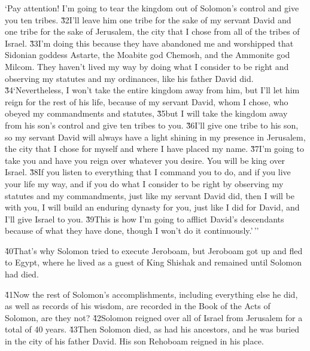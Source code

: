 \begin{poetry}
\poeml `Pay attention! I'm going to tear the kingdom out of Solomon's control and give you ten tribes. \v{32}I'll leave him one tribe for the sake of my servant David and one tribe for the sake of Jerusalem, the city that I chose from all of the tribes of Israel. \v{33}I'm doing this because they have abandoned me and worshipped that Sidonian goddess Astarte, the Moabite god Chemosh, and the Ammonite god Milcom. They haven't lived my way by doing what I consider to be right and observing my statutes and my ordinances, like his father David did. \\
\poeml \v{34}`Nevertheless, I won't take the entire kingdom away from him, but I'll let him reign for the rest of his life, because of my servant David, whom I chose, who obeyed my commandments and statutes, \v{35}but I will take the kingdom away from his son's control and give ten tribes to you. \v{36}I'll give one tribe to his son, so my servant David will always have a light shining in my presence in Jerusalem, the city that I chose for myself and where I have placed my name. \v{37}I'm going to take you and have you reign over whatever you desire. You will be king over Israel. \v{38}If you listen to everything that I command you to do, and if you live your life my way, and if you do what I consider to be right by observing my statutes and my commandments, just like my servant David did, then I will be with you, I will build an enduring dynasty for you, just like I did for David, and I'll give Israel to you. \v{39}This is how I'm going to afflict David's descendants because of what they have done, though I won't do it continuously.'\,''
\end{poetry}

\v{40}That's why Solomon tried to execute Jeroboam, but Jeroboam got up and fled to Egypt, where he lived as a guest of King Shishak and remained until Solomon had died.

\v{41}Now the rest of Solomon's accomplishments, including everything else he did, as well as records of his wisdom, are recorded in the Book of the Acts of Solomon, are they not? \v{42}Solomon reigned over all of Israel from Jerusalem for a total of 40 years. \v{43}Then Solomon died, as had his ancestors, and he was buried in the city of his father David. His son Rehoboam reigned in his place.

